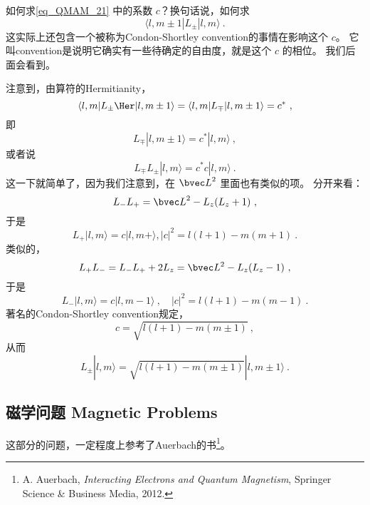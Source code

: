 \begin{exercise}{}\label{exe_QMAM_2}
如何求\autoref{eq_QMAM_21} 中的系数 $c$？换句话说，如何求
\begin{equation}
\langle l,m\pm1|L_{\pm}|l,m\rangle~.
\end{equation}
这实际上还包含一个被称为Condon-Shortley convention的事情在影响这个 $c$。 它叫convention是说明它确实有一些待确定的自由度，就是这个 $c$ 的相位。 我们后面会看到。

注意到，由算符的Hermitianity，
\begin{equation}
\langle l,m|L_{\pm}\Her|l,m\pm1\rangle = \langle l,m|L_{\mp}|l,m\pm1\rangle = c^*~,
\end{equation}
即
\begin{equation}
L_{\mp}|l,m\pm1\rangle = c^*|l,m\rangle~,
\end{equation}
或者说
\begin{equation}
L_{\mp}L_{\pm}|l,m\rangle = c^*c|l,m\rangle~.
\end{equation}
这一下就简单了，因为我们注意到，在 ${\bvec L}^2$ 里面也有类似的项。 分开来看：
\begin{equation}
L_-L_+ = {\bvec L}^2 - L_z(L_z+1)~,
\end{equation}
于是
\begin{equation}
L_+|l,m\rangle = c|l,m+\rangle, |c|^2 = l(l+1)-m(m+1)~.
\end{equation}
类似的，
\begin{equation}
L_+L_- = L_-L_+ +2L_z = {\bvec L^2} -L_z(L_z-1)~,
\end{equation}
于是
\begin{equation}
L_-|l,m\rangle = c|l,m-1\rangle~, \quad |c|^2 = l(l+1)-m(m-1) ~.
\end{equation}
著名的Condon-Shortley convention规定，
\begin{equation}
c = \sqrt{l(l+1) - m(m\pm1)}~,
\end{equation}
从而
\begin{equation}
L_{\pm}|l,m\rangle = \sqrt{l(l+1) - m(m\pm 1)}|l,m\pm1\rangle~.
\end{equation}
\end{exercise}

\subsection{磁学问题 Magnetic Problems}

这部分的问题，一定程度上参考了Auerbach的书\footnote{A. Auerbach, \textsl{Interacting Electrons and Quantum Magnetism}, Springer Science \& Business Media, 2012.}。
